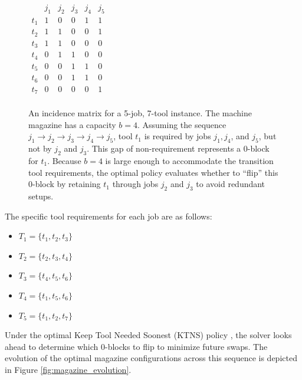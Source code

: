 \documentclass[12pt]{article}
\begin{document}
	\begin{figure}[h!]
		\centering
		$
		\begin{array}{c|ccccc}
			& j_1 & j_2 & j_3 & j_4 & j_5 \\
			\hline
			t_1 & 1 & 0 & 0 & 1 & 1 \\
			t_2 & 1 & 1 & 0 & 0 & 1 \\
			t_3 & 1 & 1 & 0 & 0 & 0 \\
			t_4 & 0 & 1 & 1 & 0 & 0 \\
			t_5 & 0 & 0 & 1 & 1 & 0 \\
			t_6 & 0 & 0 & 1 & 1 & 0 \\
			t_7 & 0 & 0 & 0 & 0 & 1 \\
		\end{array}
		$
		\caption{An incidence matrix for a 5-job, 7-tool instance. The machine magazine has a capacity $b=4$. Assuming the sequence $j_1 \to j_2 \to j_3 \to j_4 \to j_5$, tool $t_1$ is required by jobs $j_1, j_4$, and $j_5$, but not by $j_2$ and $j_3$. This gap of non-requirement represents a 0-block for $t_1$. Because $b=4$ is large enough to accommodate the transition tool requirements, the optimal policy evaluates whether to ``flip'' this 0-block by retaining $t_1$ through jobs $j_2$ and $j_3$ to avoid redundant setups.}
		\label{fig:incidence_matrix}
	\end{figure}
	
	The specific tool requirements for each job are as follows:
	\begin{itemize}[noitemsep]
		\item $T_1 = \{t_1, t_2, t_3\}$
		\item $T_2 = \{t_2, t_3, t_4\}$
		\item $T_3 = \{t_4, t_5, t_6\}$
		\item $T_4 = \{t_1, t_5, t_6\}$
		\item $T_5 = \{t_1, t_2, t_7\}$
	\end{itemize}
	
	Under the optimal Keep Tool Needed Soonest (KTNS) policy \citep{Tang1988}, the solver looks ahead to determine which 0-blocks to flip to minimize future swaps. The evolution of the optimal magazine configurations across this sequence is depicted in Figure \ref{fig:magazine_evolution}.
	
\end{document}
